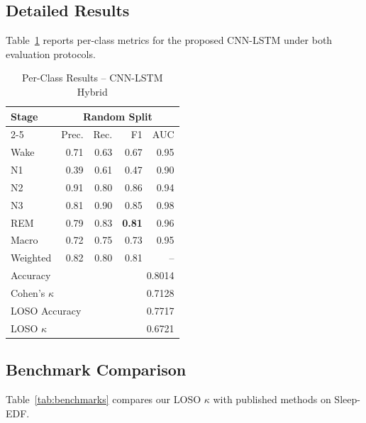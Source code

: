 \documentclass[journal]{IEEEtran}
\begin{document}
\subsection{Detailed Results}

Table~\ref{tab:results} reports per-class metrics
for the proposed CNN-LSTM under both evaluation
protocols.

\begin{table}[h]
\caption{Per-Class Results -- CNN-LSTM Hybrid}
\label{tab:results}
\centering
\begin{tabular}{lrrrr}
\toprule
\multirow{2}{*}{Stage}
& \multicolumn{4}{c}{Random Split} \\
\cmidrule(lr){2-5}
& Prec. & Rec. & F1 & AUC \\
\midrule
Wake & 0.71 & 0.63 & 0.67 & 0.95 \\
N1   & 0.39 & 0.61 & 0.47 & 0.90 \\
N2   & 0.91 & 0.80 & 0.86 & 0.94 \\
N3   & 0.81 & 0.90 & 0.85 & 0.98 \\
REM  & 0.79 & 0.83 & \textbf{0.81} & 0.96 \\
\midrule
Macro    & 0.72 & 0.75 & 0.73 & 0.95 \\
Weighted & 0.82 & 0.80 & 0.81 & -- \\
\midrule
\multicolumn{2}{l}{Accuracy} & \multicolumn{3}{r}{0.8014} \\
\multicolumn{2}{l}{Cohen's $\kappa$} & \multicolumn{3}{r}{0.7128} \\
\multicolumn{2}{l}{LOSO Accuracy} & \multicolumn{3}{r}{0.7717} \\
\multicolumn{2}{l}{LOSO $\kappa$} & \multicolumn{3}{r}{0.6721} \\
\bottomrule
\end{tabular}
\end{table}

\subsection{Benchmark Comparison}

Table~\ref{tab:benchmarks} compares our LOSO
$\kappa$ with published methods on Sleep-EDF.
\end{document}
